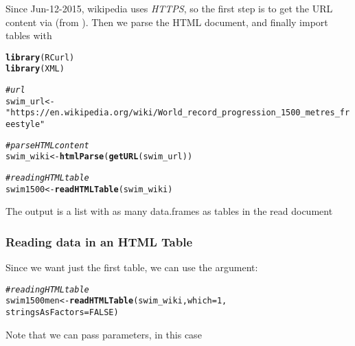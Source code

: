 \documentclass[12pt]{beamer}\usepackage[]{graphicx}\usepackage[]{color}
\makeatletter
\newcommand{\hlnum}[1]{\textcolor[rgb]{0.686,0.059,0.569}{#1}}%
\newcommand{\hlstr}[1]{\textcolor[rgb]{0.192,0.494,0.8}{#1}}%
\newcommand{\hlcom}[1]{\textcolor[rgb]{0.678,0.584,0.686}{\textit{#1}}}%
\newcommand{\hlstd}[1]{\textcolor[rgb]{0.345,0.345,0.345}{#1}}%
\newcommand{\hlkwb}[1]{\textcolor[rgb]{0.69,0.353,0.396}{#1}}%
\newcommand{\hlkwc}[1]{\textcolor[rgb]{0.333,0.667,0.333}{#1}}%
\newcommand{\hlkwd}[1]{\textcolor[rgb]{0.737,0.353,0.396}{\textbf{#1}}}%
\newenvironment{kframe}{%
 \def\at@end@of@kframe{}%
 \ifinner\ifhmode%
  \def\at@end@of@kframe{\end{minipage}}%
  \begin{minipage}{\columnwidth}%
 \fi\fi%
 \def\FrameCommand##1{\hskip\@totalleftmargin \hskip-\fboxsep
 \colorbox{shadecolor}{##1}\hskip-\fboxsep
     \hskip-\linewidth \hskip-\@totalleftmargin \hskip\columnwidth}%
 \MakeFramed {\advance\hsize-\width
   \@totalleftmargin\z@ \linewidth\hsize
   \@setminipage}}%
 {\par\unskip\endMakeFramed%
 \at@end@of@kframe}
\newenvironment{knitrout}{}{} %
\makeatother
\begin{document}

\begin{frame}[fragile]
\frametitle{}

Since Jun-12-2015, wikipedia uses \textit{HTTPS}, so the first step is to get the URL content via {\hilit {}} (from ). Then we parse the HTML document, and finally import tables with 
\begin{knitrout}\tiny
{}\color{fgcolor}\begin{kframe}
\begin{alltt}
\hlkwd{library}\hlstd{(RCurl)}
\hlkwd{library}\hlstd{(XML)}

\hlcom{# url}
\hlstd{swim_url} \hlkwb{<-} \hlstr{"https://en.wikipedia.org/wiki/World_record_progression_1500_metres_freestyle"}
\end{alltt}
\end{kframe}
\end{knitrout}

\begin{knitrout}\scriptsize
{}\color{fgcolor}\begin{kframe}
\begin{alltt}
\hlcom{# parse HTML content}
\hlstd{swim_wiki} \hlkwb{<-} \hlkwd{htmlParse}\hlstd{(}\hlkwd{getURL}\hlstd{(swim_url))}

\hlcom{# reading HTML table}
\hlstd{swim1500} \hlkwb{<-} \hlkwd{readHTMLTable}\hlstd{(swim_wiki)}
\end{alltt}
\end{kframe}
\end{knitrout}

The output is a list with as many data.frames as tables in the read document
\end{frame}


\begin{frame}[fragile]
\frametitle{Reading data in an HTML Table}

Since we want just the first table, we can use the {\hilit {}} argument:
\begin{knitrout}\scriptsize
{}\color{fgcolor}\begin{kframe}
\begin{alltt}
\hlcom{# reading HTML table}
\hlstd{swim1500men} \hlkwb{<-} \hlkwd{readHTMLTable}\hlstd{(swim_wiki,} \hlkwc{which} \hlstd{=} \hlnum{1}\hlstd{,}
                             \hlkwc{stringsAsFactors} \hlstd{=} \hlnum{FALSE}\hlstd{)}
\end{alltt}
\end{kframe}
\end{knitrout}

Note that we can pass  parameters, in this case 
\end{frame}
\end{document}
